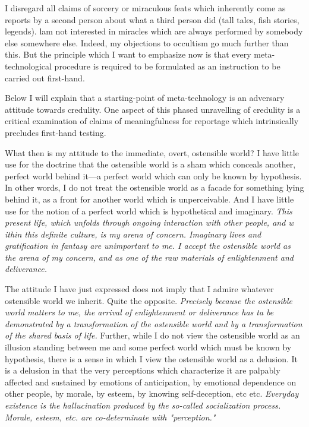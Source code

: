 I disregard all claims of sorcery or miraculous feats which inherently come as 
reports by a second person about what a third person did (tall tales, fish stories, 
legends). lam not interested in miracles which are always performed by somebody 
else somewhere else. Indeed, my objections to occultism go much further than this. 
But the principle which I want to emphasize now is that every meta-technological 
procedure is required to be formulated as an instruction to be carried out first-hand. 

Below I will explain that a starting-point of meta-technology is an 
adversary attitude towards credulity. One aspect of this phased unravelling of credulity 
is a critical examination of claims of meaningfulness for reportage which intrinsically 
precludes first-hand testing. 

\visbreak

What then is my attitude to the immediate, overt, ostensible world? I have little 
use for the doctrine that the ostensible world is a sham which conceals another, 
perfect world behind it---a perfect world which can only be known by hypothesis. 
In other words, I do not treat the ostensible world as a facade for something lying 
behind it, as a front for another world which is unperceivable. And I have little use 
for the notion of a perfect world which is hypothetical and imaginary. \textit{This present 
life, which unfolds through ongoing interaction with other people, and w ithin this definite 
culture, is my arena of concern. Imaginary lives and gratification in fantasy are unimportant 
to me. I accept the ostensible world as the arena of my concern, and as one of the 
raw materials of enlightenment and deliverance.}

The attitude I have just expressed does not imply that I admire whatever 
ostensible world we inherit. Quite the opposite. \textit{Precisely because the ostensible world 
matters to me, the arrival of enlightenment or deliverance has ta be demonstrated by a 
transformation of the ostensible world and by a transformation of the shared basis of life.}
Further, while I do not view the ostensible world as an illusion standing between 
me and some perfect world which must be known by hypothesis, there is a sense in 
which I view the ostensible world as a delusion. It is a delusion in that the very 
perceptions which characterize it are palpably affected and sustained by emotions 
of anticipation, by emotional dependence on other people, by morale, by esteem, 
by knowing self-deception, etc etc. \textit{Everyday existence is the hallucination produced 
by the so-called socialization process. Morale, esteem, etc. are co-determinate with 
"perception."}

